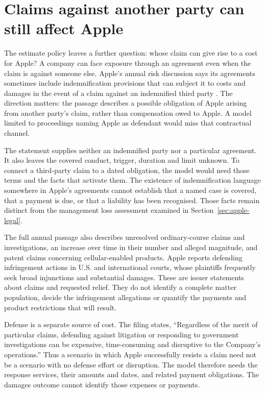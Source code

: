 \section{Claims against another party can still affect Apple}
\label{sec:apple-litigation-risk}

The estimate policy leaves a further question: whose claim can give rise to a
cost for Apple? A company can face exposure through an agreement even when the
claim is against someone else. Apple's annual risk discussion says its
agreements sometimes include indemnification provisions that can subject it to
costs and damages in the event of a claim against an indemnified third party
\citep[Risk Factors, printed p.~13]{apple2024}. The direction matters: the
passage describes a possible obligation of Apple arising from another party's
claim, rather than compensation owed to Apple. A model limited to proceedings
naming Apple as defendant would miss that contractual channel.

The statement supplies neither an indemnified party nor a particular agreement.
It also leaves the covered conduct, trigger, duration and limit unknown. To
connect a third-party claim to a dated obligation, the model would need those
terms and the facts that activate them. The existence of indemnification
language somewhere in Apple's agreements cannot establish that a named case
is covered, that a payment is due, or that a liability has been recognised.
Those facts remain distinct from the management loss assessment examined in
Section~\ref{sec:apple-legal}.

The full annual passage also describes unresolved ordinary-course claims and
investigations, an increase over time in their number and alleged magnitude,
and patent claims concerning cellular-enabled products. Apple reports defending
infringement actions in U.S. and international courts, whose plaintiffs
frequently seek broad injunctions and substantial damages. These are issuer
statements about claims and requested relief. They do not identify a complete
matter population, decide the infringement allegations or quantify the
payments and product restrictions that will result.

Defense is a separate source of cost. The filing states, ``Regardless of the
merit of particular claims, defending against litigation or responding to
government investigations can be expensive, time-consuming and disruptive to
the Company's operations.'' Thus a scenario in which Apple successfully
resists a claim need not be a scenario with no defense effort or disruption.
The model therefore needs the response services, their amounts and dates,
and related payment obligations. The damages outcome cannot identify those
expenses or payments.

